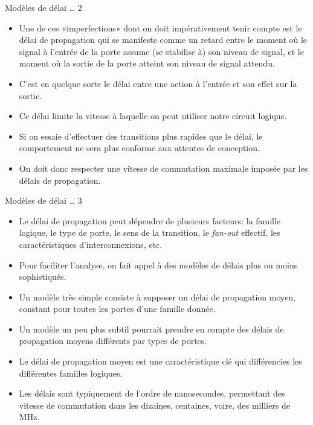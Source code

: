 \documentclass[presentation]{beamer}
\begin{document}
\begin{frame}[label={sec:org938933c}]{Modèles de délai \ldots{} 2}
\begin{itemize}
\item Une de ces «imperfections» dont on doit impérativement tenir compte est le \alert{délai de propagation} qui se manifeste comme un retard entre le moment où le signal à l'entrée de la porte assume (se stabilise à) son niveau de signal, et le moment où la sortie de la porte atteint son niveau de signal attendu.

\item C'est en quelque sorte le délai entre une action à l'entrée et son effet sur la sortie.

\item Ce délai limite la vitesse à laquelle on peut utiliser notre circuit logique.

\item Si on essaie d'effectuer des transitions plus rapides que le délai, le comportement ne sera plus conforme aux attentes de conception.

\item On doit donc respecter une vitesse de commutation maximale imposée par les délais de propagation.
\end{itemize}
\end{frame}

\begin{frame}[label={sec:orgbaae48d}]{Modèles de délai \ldots{} 3}
\begin{itemize}
\item Le délai de propagation peut dépendre de plusieurs facteurs: la famille logique, le type de porte, le sens de la transition, le \emph{fan-out} effectif, les caractéristiques d'interconnexions, etc.

\item Pour faciliter l'analyse, on fait appel à des modèles de délais plus ou moins sophistiqués.

\item Un modèle très simple consiste à supposer un délai de propagation moyen, constant pour toutes les portes d'une famille donnée.

\item Un modèle un peu plus subtil pourrait prendre en compte des délais de propagation moyens différents par types de portes.

\item Le délai de propagation moyen est une caractéristique clé qui différencies les différentes familles logiques.

\item Les délais sont typiquement de l'ordre de nanosecondes, permettant des vitesse de commutation dans les dizaines, centaines, voire, des milliers de MHz.
\end{itemize}
\end{frame}
\end{document}
